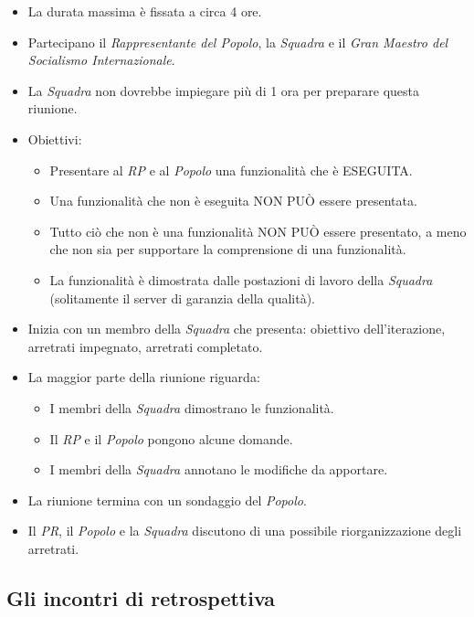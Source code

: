 \begin{itemize}
  \item La durata massima \`e fissata a circa 4 ore.
  \item Partecipano il \textit{Rappresentante del Popolo}, la \textit{Squadra} e il \textit{Gran Maestro del Socialismo Internazionale}.
  \item La \textit{Squadra} non dovrebbe impiegare pi\`u di 1 ora per preparare questa riunione.
  \item Obiettivi:
  \begin{itemize}
    \item Presentare al \textit{RP} e al \textit{Popolo} una funzionalit\`a che \`e ESEGUITA.
    \item Una funzionalit\`a che non \`e eseguita NON PU\`O essere presentata.
    \item Tutto ciò che non \`e una funzionalità NON PU\`O essere presentato, a meno che non sia per supportare la comprensione di una funzionalit\`a.
    \item La funzionalit\`a \`e dimostrata dalle postazioni di lavoro della \textit{Squadra} (solitamente il server di garanzia della qualit\`a).
  \end{itemize}
  \item Inizia con un membro della \textit{Squadra} che presenta: obiettivo dell'iterazione, arretrati impegnato, arretrati completato.
  \item La maggior parte della riunione riguarda:
  \begin{itemize}
    \item I membri della \textit{Squadra} dimostrano le funzionalit\`a.
    \item Il \textit{RP} e il \textit{Popolo} pongono alcune domande.
    \item I membri della \textit{Squadra} annotano le modifiche da apportare.
  \end{itemize}
  \item La riunione termina con un sondaggio del \textit{Popolo}.
  \item Il \textit{PR}, il \textit{Popolo} e la \textit{Squadra} discutono di una possibile riorganizzazione degli arretrati.
\end{itemize}

\subsection{Gli incontri di retrospettiva}

